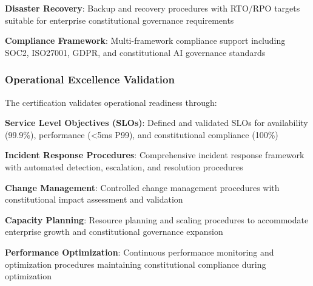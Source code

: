 \noindent\textbf{Disaster Recovery}: Backup and recovery procedures with RTO/RPO targets suitable for enterprise constitutional governance requirements

\noindent\textbf{Compliance Framework}: Multi-framework compliance support including SOC2, ISO27001, GDPR, and constitutional AI governance standards

\subsubsection{Operational Excellence Validation}
The certification validates operational readiness through:

\noindent\textbf{Service Level Objectives (SLOs)}: Defined and validated SLOs for availability (99.9\%), performance (<5ms P99), and constitutional compliance (100\%)

\noindent\textbf{Incident Response Procedures}: Comprehensive incident response framework with automated detection, escalation, and resolution procedures

\noindent\textbf{Change Management}: Controlled change management procedures with constitutional impact assessment and validation

\noindent\textbf{Capacity Planning}: Resource planning and scaling procedures to accommodate enterprise growth and constitutional governance expansion

\noindent\textbf{Performance Optimization}: Continuous performance monitoring and optimization procedures maintaining constitutional compliance during optimization

